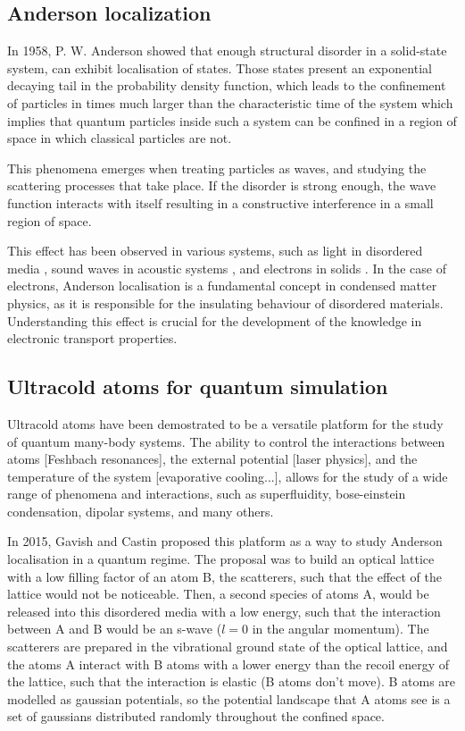 \subsection{Anderson localization}

In 1958, P. W. Anderson \cite{andersonAbsenceDiffusionCertain1958} showed that enough structural disorder in a solid-state system, can exhibit localisation of states. Those states present an exponential decaying tail in the probability density function, which leads to the confinement of particles in times much larger than the characteristic time of the system which implies that quantum particles inside such a system can be confined in a region of space in which classical particles are not.

This phenomena emerges when treating particles as waves, and studying the scattering processes that take place. If the disorder is strong enough, the wave function interacts with itself resulting in a constructive interference in a small region of space.

This effect has been observed in various systems, such as light in disordered media \cite{wiersma_localization_1997}, sound waves in acoustic systems \cite{hu_localization_2018}, and electrons in solids \cite{abrahams_scaling_1979}. In the case of electrons, Anderson localisation is a fundamental concept in condensed matter physics, as it is responsible for the insulating behaviour of disordered materials. Understanding this effect is crucial for the development of the knowledge in electronic transport properties.


\subsection{Ultracold atoms for quantum simulation}

Ultracold atoms have been demostrated to be a versatile platform for the study of quantum many-body systems. The ability to control the interactions between atoms [Feshbach resonances], the external potential [laser physics], and the temperature of the system [evaporative cooling...], allows for the study of a wide range of phenomena and interactions, such as superfluidity, bose-einstein condensation, dipolar systems, and many others.

In 2015, Gavish and Castin \cite{gavishMatterwave2005} proposed this platform as a way to study Anderson localisation in a quantum regime. The proposal was to build an optical lattice with a low filling factor of an atom B, the scatterers, such that the effect of the lattice would not be noticeable. Then, a second species of atoms A, would be released into this disordered media with a low energy, such that the interaction between A and B would be an s-wave ($l=0$ in the angular momentum). The scatterers are prepared in the vibrational ground state of the optical lattice, and the atoms A interact with B atoms with a lower energy than the recoil energy of the lattice, such that the interaction is elastic (B atoms don't move). B atoms are modelled as gaussian potentials, so the potential landscape that A atoms see is a set of gaussians distributed randomly throughout the confined space.

